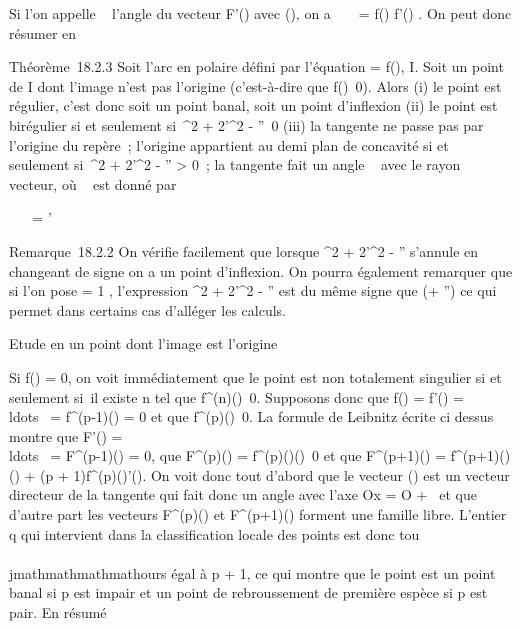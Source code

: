 Si l'on appelle \alpha~ l'angle du vecteur F'(\theta) avec
\vecu(\theta), on a
\mathrmtg~ \alpha~ = f(\theta)
\over f'(\theta) . On peut donc résumer en

Théorème~18.2.3 Soit \Gamma l'arc en polaire défini par l'équation \rho = f(\theta),
\theta \in I. Soit \theta un point de I dont l'image n'est pas l'origine
(c'est-à-dire que f(\theta)\neq~0). Alors (i) le point
est régulier, c'est donc soit un point banal, soit un point d'inflexion
(ii) le point est birégulier si et seulement si~\rho^2 +
2\rho'^2 - \rho\rho''\neq~0 (iii) la tangente
ne passe pas par l'origine du repère~; l'origine appartient au demi plan
de concavité si et seulement si~\rho^2 + 2\rho'^2 - \rho\rho''
\textgreater{} 0~; la tangente fait un angle \alpha~ avec le rayon vecteur, où
\alpha~ est donné par

\mathrmtg~ \alpha~ = \rho
\over \rho'

Remarque~18.2.2 On vérifie facilement que lorsque \rho^2 +
2\rho'^2 - \rho\rho'' s'annule en changeant de signe on a un point
d'inflexion. On pourra également remarquer que si l'on pose \phi = 1
\over \rho , l'expression \rho^2 +
2\rho'^2 - \rho\rho'' est du même signe que \phi(\phi + \phi'') ce qui permet
dans certains cas d'alléger les calculs.

Etude en un point dont l'image est l'origine

Si f(\theta) = 0, on voit immédiatement que le point est non totalement
singulier si et seulement si~il existe n tel que
f^(n)(\theta)\neq~0. Supposons donc que
f(\theta) = f'(\theta) =
\\ldots~ =
f^(p-1)(\theta) = 0 et que
f^(p)(\theta)\neq~0. La formule de Leibnitz
écrite ci dessus montre que F'(\theta) =
\\ldots~ =
F^(p-1)(\theta) = 0, que F^(p)(\theta) =
f^(p)(\theta)\vecu(\theta)\neq~0
et que F^(p+1)(\theta) =
f^(p+1)(\theta)\vecu(\theta) + (p +
1)f^(p)(\theta)\vecu'(\theta). On voit donc tout
d'abord que le vecteur \vecu(\theta) est un vecteur
directeur de la tangente qui fait donc un angle \theta avec l'axe Ox = O +
~\vec\imath et que d'autre part les vecteurs
F^(p)(\theta) et F^(p+1)(\theta) forment une famille libre.
L'entier q qui intervient dans la classification locale des points est
donc tou\\\\jmathmathmathmathours égal à p + 1, ce qui montre que le point est un point
banal si p est impair et un point de rebroussement de première espèce si
p est pair. En résumé

